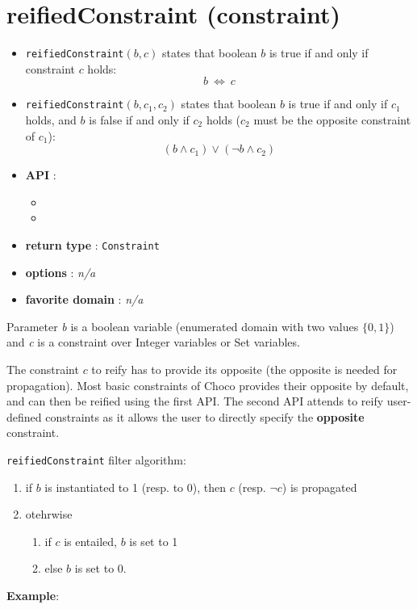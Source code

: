 \section{reifiedConstraint (constraint)}\label{reifiedconstraint:reifiedconstraintconstraint}\hypertarget{reifiedconstraint:reifiedconstraintconstraint}{}
\begin{notedef}
  \begin{itemize}
  \item \texttt{reifiedConstraint}$(b,c)$ states that boolean $b$ is true if and only if constraint $c$ holds:
  $$b\ \iff\ c$$
  \item \texttt{reifiedConstraint}$(b,c_1,c_2)$ states that boolean $b$ is true if and only if $c_1$ holds, and $b$ is false if and only if $c_2$ holds ($c_2$ must be the opposite constraint of $c_1$):
$$(b\land c_1) \lor (\neg b \land c_2)$$
  \end{itemize}
\end{notedef}

\begin{itemize}
	\item \textbf{API} :
	\begin{itemize}
		\item {}
		\item {}
	\end{itemize}
	\item \textbf{return type} : \texttt{Constraint}
	\item \textbf{options} : \emph{n/a}
	\item \textbf{favorite domain} : \emph{n/a}
\end{itemize}

Parameter \emph{b} is a boolean variable (enumerated domain with two values $\{0,1\}$) and \emph{c} is a constraint over Integer variables or Set variables.

The constraint $c$ to reify has to provide its opposite (the opposite is needed for propagation). Most basic constraints of Choco provides their opposite by default, and can then be reified using the first API.
The second API attends to reify user-defined constraints as it allows the user to directly specify the \textbf{opposite} constraint. 

{\tt  reifiedConstraint} filter algorithm:
\begin{enumerate}
	\item if $b$ is instantiated to 1 (resp. to 0), then $c$ (resp. $\neg c$) is propagated
	\item otehrwise
	\begin{enumerate}
		\item if $c$ is entailed, $b$ is set to 1
		\item else $b$ is set to 0.
	\end{enumerate}
\end{enumerate}


\textbf{Example}:


